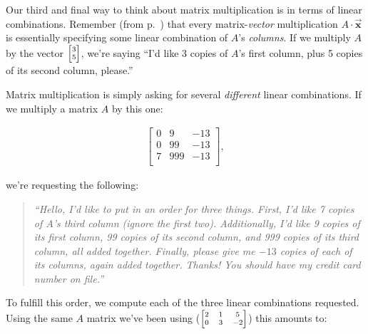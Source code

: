 Our third and final way to think about matrix multiplication is in terms of
linear combinations. Remember (from p.~\pageref{linearComboOfColumns}) that
every matrix-\textit{vector} multiplication $A \cdot
\overrightarrow{\textbf{x}}$ is essentially specifying some linear combination
of $A$'s \textit{columns}. If we multiply $A$ by the vector ${\scriptsize
\begin{bmatrix} 3 \\ 5 \\ \end{bmatrix}}$, we're saying ``I'd like 3 copies of
$A$'s first column, plus 5 copies of its second column, please.''

Matrix multiplication is simply asking for several \textit{different} linear
combinations. If we multiply a matrix $A$ by this one:

\vspace{-.15in}
\begin{align*}
\begin{bmatrix}
0 & 9 & -13 \\
0 & 99 & -13 \\
7 & 999 & -13 \\
\end{bmatrix},
\end{align*}
\vspace{-.15in}

we're requesting the following:

\begin{quote}
\textit{
``Hello, I'd like to put in an order for three things. First, I'd like 7 copies
of $A$'s third column (ignore the first two). Additionally, I'd like 9 copies
of its first column, 99 copies of its second column, and 999 copies of its
third column, all added together. Finally, please give me $-13$ copies of each
of its columns, again added together. Thanks! You should have my credit card
number on file.''
}
\end{quote}

To fulfill this order, we compute each of the three linear combinations
requested. Using the same $A$ matrix we've been using (${\scriptsize
\begin{bmatrix} 2 & 1 & 5 \\ 0 & 3 & -2 \end{bmatrix}}$) this amounts to:

